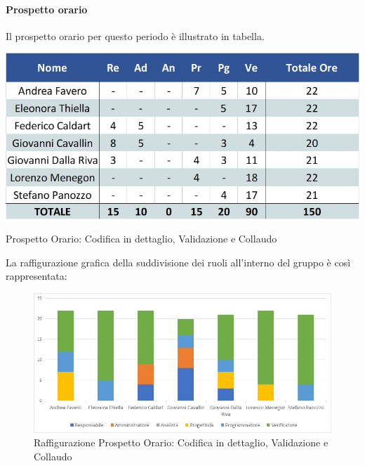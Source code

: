 \paragraph{Prospetto orario}
Il prospetto orario per questo periodo è illustrato in tabella.
\begin{table}[H]
	\centerline{\includegraphics[scale=0.7]{img/Preventivo/CodDettaglioValidazioneCollaudoOrario.jpg}}
	\caption{Prospetto Orario: Codifica in dettaglio, Validazione e Collaudo}
	\clearpage
\end{table}
La raffigurazione grafica della suddivisione dei ruoli all'interno del gruppo è così rappresentata: 
\begin{figure}[H]
	\centerline{\includegraphics[scale=0.85]{img/Preventivo/Istogrammi/CodDettaglioValidazioneCollaudo.jpg}}
	\caption{Raffigurazione Prospetto Orario: Codifica in dettaglio, Validazione e Collaudo}
	\clearpage
\end{figure}
\newpage
